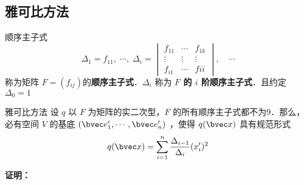\subsection{雅可比方法}
\begin{definition}{顺序主子式}
\begin{equation}
\Delta_1=f_{11},\;\cdots,\;\Delta_i=\begin{vmatrix}
f_{11}&\cdots&f_{1k}\\
\vdots&\vdots&\vdots\\
f_{i1}&\cdots&f{ii}
\end{vmatrix},\quad
\cdots
\end{equation}
称为矩阵 $F=(f_{ij})$的\textbf{顺序主子式}．$\Delta_i$ 称为\textbf{ $F$ 的 $i$ 阶顺序主子式}．且约定 $\Delta_0=1$
\end{definition}
\begin{theorem}{雅可比方法}
设 $q$ 以 $F$ 为矩阵的实二次型，$F$ 的所有顺序主子式都不为9．那么，必有空间 $V$ 的基底 $(\bvec e'_1,\cdots,\bvec e'_n)$ ，使得 $q(\bvec x)$ 具有规范形式
\begin{equation}
q(\bvec x)=\sum_{i=1}^n\frac{\Delta_{i-1}}{\Delta_i}(x'_i)^2
\end{equation}
\end{theorem}
\textbf{证明：}
